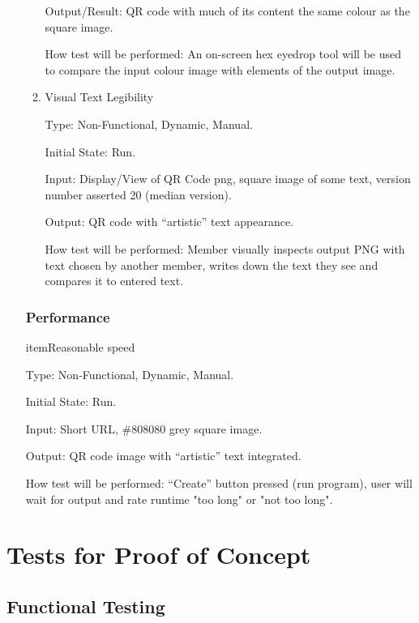 \documentclass[12pt, titlepage]{article}
\begin{document}
\begin{enumerate}
\begin{enumerate}
Output/Result: QR code with much of its content the same colour as the square image.
					
How test will be performed: An on-screen hex eyedrop tool will be used to compare the input colour image with elements of the output image.
					
\item{Visual Text Legibility\\}

Type: Non-Functional, Dynamic, Manual.
					
Initial State: Run.
					
Input: Display/View of QR Code png, square image of some text, version number asserted 20 (median version).
					
Output: QR code with ``artistic'' text appearance.
					
How test will be performed: Member visually inspects output PNG with text chosen by another member, writes down the text they see and compares it to entered text.

\end{enumerate}

\subsubsection{Performance}

item{Reasonable speed\\}

Type: Non-Functional, Dynamic, Manual.
					
Initial State: Run. 
					
Input: Short URL, \#808080 grey square image.
					
Output: QR code image with ``artistic'' text integrated.
					
How test will be performed: ``Create'' button pressed (run program), user will wait for output and rate runtime "too long" or "not too long".

\end{enumerate}

\section{Tests for Proof of Concept}

\subsection{Functional Testing}
\end{document}
